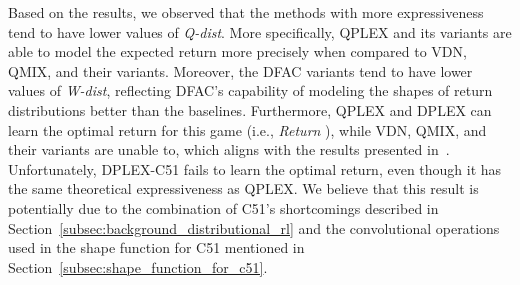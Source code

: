 \documentclass[twoside,11pt]{article}
\begin{document}
Based on the results, we observed that the methods with more expressiveness tend to have lower values of \textit{Q-dist}. More specifically, QPLEX and its variants are able to model the expected return more precisely when compared to VDN, QMIX, and their variants.
Moreover, the DFAC variants tend to have lower values of \textit{W-dist}, reflecting DFAC's capability of modeling the shapes of return distributions better than the baselines.
Furthermore, QPLEX and DPLEX can learn the optimal return for this game (i.e., \textit{Return} ), while VDN, QMIX, and their variants are unable to, which aligns with the results presented in~\cite{Wang2020QPLEX}.
Unfortunately, DPLEX-C51 fails to learn the optimal return, even though it has the same theoretical expressiveness as QPLEX. We believe that this result is potentially due to the combination of C51's shortcomings described in Section~\ref{subsec:background_distributional_rl} and the convolutional operations used in the shape function for C51 mentioned in Section~\ref{subsec:shape_function_for_c51}.
\end{document}
